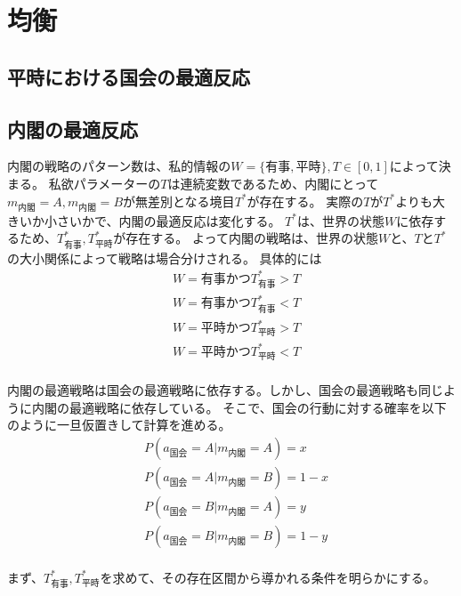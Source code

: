 \documentclass[main.tex]{subfiles}
\begin{document}
\section{均衡}


\subsection{平時における国会の最適反応}




\subsection{内閣の最適反応}

内閣の戦略のパターン数は、私的情報の$W=\lbrace 有事, 平時\rbrace, T\in[0,1]$によって決まる。
私欲パラメーターの$T$は連続変数であるため、内閣にとって$m_{内閣}=A,m_{内閣}=B$が無差別となる境目$T^*$が存在する。
実際の$T$が$T^*$よりも大きいか小さいかで、内閣の最適反応は変化する。
$T^*$は、世界の状態$W$に依存するため、$T^*_{有事}, T^*_{平時}$が存在する。
よって内閣の戦略は、世界の状態$W$と、$T$と$T^*$の大小関係によって戦略は場合分けされる。
具体的には
\begin{align*}
    & W=有事 かつ T^*_{有事}>T  \\
    & W=有事 かつ T^*_{有事}<T  \\
    & W=平時 かつ T^*_{平時}>T  \\
    & W=平時 かつ T^*_{平時}<T  \\
\end{align*}



内閣の最適戦略は国会の最適戦略に依存する。しかし、国会の最適戦略も同じように内閣の最適戦略に依存している。
そこで、国会の行動に対する確率を以下のように一旦仮置きして計算を進める。
\begin{align*}
    & P(a_{国会} = A| m_{内閣} = A) = x \\
    & P(a_{国会} = A| m_{内閣} = B) = 1-x \\
    & P(a_{国会} = B| m_{内閣} = A) = y \\
    & P(a_{国会} = B| m_{内閣} = B) = 1-y \\
\end{align*}

まず、$T^*_{有事}, T^*_{平時}$を求めて、その存在区間から導かれる条件を明らかにする。
\end{document}
